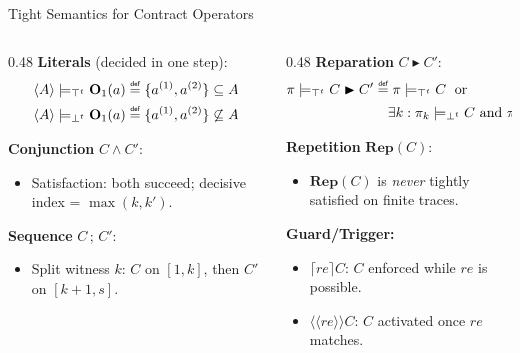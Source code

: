 \documentclass[9pt,aspectratio=169]{beamer}
\newcommand{\repair}{\ensuremath{\blacktriangleright}}
\newcommand{\obl}[2][]{\mathbf{O}_{#1}(#2)}
\newcommand{\repit}[1]{\mathbf{Rep}(#1)}
\newcommand{\guard}[2][]{\lceil #1 \rceil #2}
\newcommand{\trig}[2][]{\langle\!\langle #1 \rangle\!\rangle #2}
\newcommand{\trace}[1]{\ensuremath{\langle #1 \rangle}\xspace}
\newcommand{\nd}{\text{ and }}
\newcommand{\sor}{\text{ or }}
\newcommand{\topt}{\top^t}
\newcommand{\bott}{\bot^t}
\newcommand{\satt}{\models_{\topt}}
\newcommand{\violt}{\models_{\bott}}
\newcommand{\tightverdicts}{\ensuremath{\mathbb{V}_5}\xspace}
\newcommand{\mydef}{\mathrel{\overset{\makebox[0pt]{\mbox{\normalfont\tiny\sffamily def}}}{=}}}
\begin{document}
\begin{frame}{Tight Semantics for Contract Operators}
\small
\begin{columns}[T]
\begin{column}{0.48\textwidth}
  \textbf{Literals} (decided in one step):
  \begin{align*}
    \trace{A} \satt \obl[1]{a} &\mydef \{a^{(1)},a^{(2)}\} \subseteq A\\
    \trace{A} \violt \obl[1]{a} &\mydef \{a^{(1)},a^{(2)}\} \not\subseteq A
  \end{align*}

  \textbf{Conjunction} $C \wedge C'$:
  \begin{itemize}
    \item Satisfaction: both succeed; decisive index = $\max(k,k')$.
  \end{itemize}

  \textbf{Sequence} $C\,;\,C'$:
  \begin{itemize}
    \item Split witness $k$: $C$ on $[1,k]$, then $C'$ on $[k{+}1,s]$.
  \end{itemize}
\end{column}
\begin{column}{0.48\textwidth}
  \textbf{Reparation} $C \repair C'$:
  \begin{align*}
    \pi \satt C \repair C' &\mydef \pi \satt C \;\sor\\
      &\quad \exists k: \pi_k \violt C \nd \pi^k \satt C'
  \end{align*}

  \textbf{Repetition} $\repit{C}$:
  \begin{itemize}
    \item $\repit{C}$ is \emph{never} tightly satisfied on finite traces.
  \end{itemize}

  \textbf{Guard/Trigger:}
  \begin{itemize}
    \item $\guard[re]{C}$: $C$ enforced while $re$ is possible.
    \item $\trig[re]{C}$: $C$ activated once $re$ matches.
  \end{itemize}
\end{column}
\end{columns}

\vspace{2mm}
\centering
{}
\end{frame}
\end{document}
